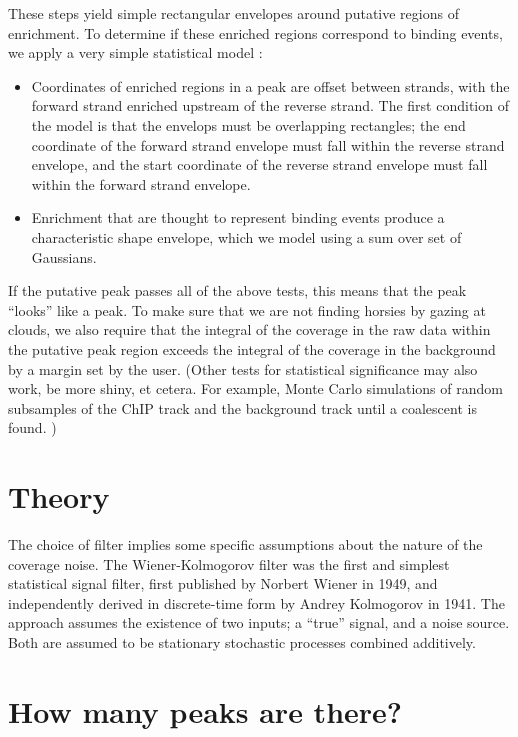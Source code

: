 \documentclass{article}
\begin{document}
These steps yield simple rectangular envelopes around putative regions
of enrichment. To determine if these enriched regions correspond to
binding events, we apply a very simple statistical model :

\begin{itemize}

\item Coordinates of enriched regions in a peak are offset between
  strands, with the forward strand enriched upstream of the reverse
  strand. The first condition of the model is that the envelops must
  be overlapping rectangles; the end coordinate of the forward strand
  envelope must fall within the reverse strand envelope, and the
  start coordinate of the reverse strand envelope must fall within the
  forward strand envelope. 

\item Enrichment that are thought to represent binding events produce
  a characteristic shape envelope, which we model using a sum over set
  of Gaussians.

\end{itemize}

If the putative peak passes all of the above tests, this means that
the peak ``looks'' like a peak. To make sure that we are not finding
horsies by gazing at clouds, we also require that the integral of the
coverage in the raw data within the putative peak region exceeds the
integral of the coverage in the background by a margin set by the
user. (Other tests for statistical significance may also work, be more
shiny, et cetera. For example, Monte Carlo simulations of random
subsamples of the ChIP track and the background track until a
coalescent is found. )

\section{Theory}

The choice of filter implies some specific assumptions about the
nature of the coverage noise. The Wiener-Kolmogorov filter was the
first and simplest statistical signal filter, first published by
Norbert Wiener in 1949, and independently derived in discrete-time
form by Andrey Kolmogorov in 1941. The approach assumes the existence
of two inputs; a ``true'' signal, and a noise source. Both are assumed
to be stationary stochastic processes combined additively. 

\section{How many peaks are there?}
\end{document}
